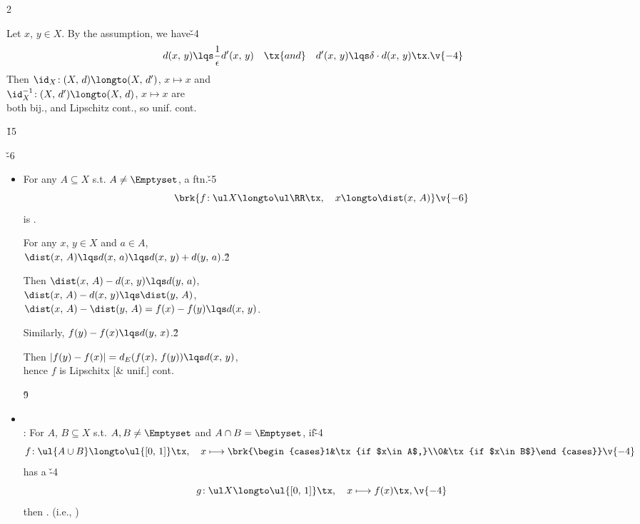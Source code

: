 \documentclass[dvipdfmx,a4paper,titlepage,9pt]{jsarticle}
\begin{document}
\begin{multicols*}{2}
\begin{Pfbox}
Let $x$, $y\in X$. By the assumption, we have\v{-4}
$$d(x,\,y)\lqs\frac1\epsilon d'(x,\,y)\quad\tx{and}\quad d'(x,\,y)\lqs\delta\cdot d(x,\,y)\tx.\v{-4}$$
Then $\id_X\!: (X,\,d)\longto(X,\,d')$, $x\longmapsto x$ and\\
$\id_X^{-1}\!: (X,\,d')\longto(X,\,d)$, $x\longmapsto x$ are\\
both bij., and Lipschitz cont., so unif. cont.
\end{Pfbox}\v{15}

\newpage


\v{-6}
\begin{itemize}[label=-]
\item For any $A\subseteq X$ s.t. $A\neq\Emptyset$, a ftn.\v{-5}
$$\brk{f\!: \ul X\longto\ul\RR\tx,\quad x\longto\dist(x,\,A)}\v{-6}$$
is .

\begin{Pfbox}
For any $x$, $y\in X$ and $a\in A$,\\
$\dist(x,\,A)\lqs d(x,\,a)\lqs d(x,\,y)+d(y,\,a)$.\v2

Then $\dist(x,\,A)-d(x,\,y)\lqs d(y,\,a)$,\\
$\dist(x,\,A)-d(x,\,y)\lqs\dist(y,\,A)$,\\
$\dist(x,\,A)-\dist(y,\,A)=f(x)-f(y)\lqs d(x,\,y)$.

Similarly, $f(y)-f(x)\lqs d(y,\,x)$.\v2

Then $|f(y)-f(x)|=d_E(f(x),\,f(y))\lqs d(x,\,y)$,\\
hence $f$ is Lipschitx [\& unif.] cont.
\end{Pfbox}\v9

\item{}\\
: For $A$, $B\subseteq X$ s.t. $A, B\neq\Emptyset$ and $A\cap B=\Emptyset$, if\v{-4}
$$f\!: \ul{A\cup B}\longto \ul{[0,\,1]}\tx,\quad x\longmapsto\brk{\begin{cases}1&\tx{if $x\in A$,}\\0&\tx{if $x\in B$}\end{cases}}\v{-4}$$
\;\;has a \v{-4}
$$g\!:\ul X\longto\ul{[0,\,1]}\tx,\quad x\longmapsto f(x)\tx,\v{-4}$$
\;\;then . (i.e., )


\end{itemize}
\end{multicols*}
\end{document}
